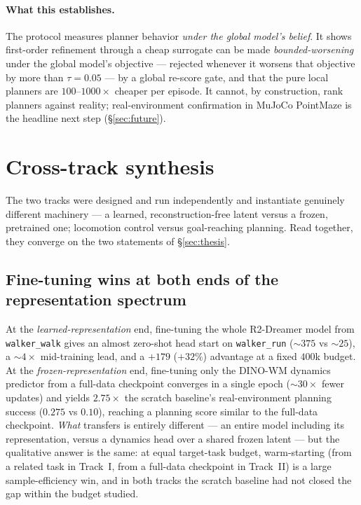\documentclass[11pt,a4paper]{article}
\begin{document}
\paragraph{What this establishes.} The protocol measures planner behavior
\emph{under the global model's belief}. It shows first-order refinement through a
cheap surrogate can be made \emph{bounded-worsening} under the global model's
objective --- rejected whenever it worsens that objective by more than
$\tau{=}0.05$ --- by a global re-score gate, and that the pure local planners are
$100$--$1000\times$ cheaper per episode. It cannot, by construction, rank planners against reality;
real-environment confirmation in MuJoCo PointMaze is the headline next step
(\S\ref{sec:future}).

\section{Cross-track synthesis}
\label{sec:synthesis}

The two tracks were designed and run independently and instantiate genuinely
different machinery --- a learned, reconstruction-free latent versus a frozen,
pretrained one; locomotion control versus goal-reaching planning. Read together,
they converge on the two statements of \S\ref{sec:thesis}.

\subsection{Fine-tuning wins at both ends of the representation spectrum}
\label{sec:synthesis-finetune}

At the \emph{learned-representation} end, fine-tuning the whole R2-Dreamer model
from \texttt{walker\_walk} gives an almost zero-shot head start on
\texttt{walker\_run} ($\sim\!375$ vs $\sim\!25$), a ${\sim}4\times$ mid-training
lead, and a $+179$ ($+32\%$) advantage at a fixed $400$k budget. At the
\emph{frozen-representation} end, fine-tuning only the DINO-WM dynamics
predictor from a full-data checkpoint converges in a single epoch (${\sim}30\times$
fewer updates) and yields $2.75\times$ the scratch baseline's real-environment
planning success ($0.275$ vs $0.10$), reaching a planning score similar to the
full-data checkpoint. \emph{What} transfers is entirely different --- an entire
model including its representation, versus a dynamics head over a shared frozen
latent --- but the qualitative answer is the same: at equal target-task budget,
warm-starting (from a related task in Track~I, from a full-data checkpoint in
Track~II) is a large sample-efficiency win, and in both tracks the scratch
baseline had not closed the gap within the budget studied.
\end{document}
